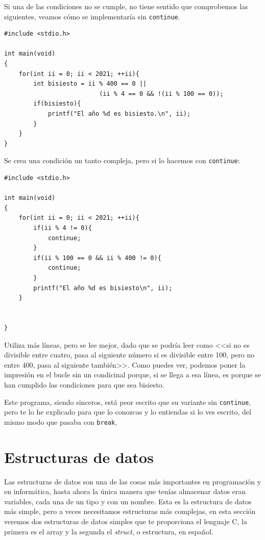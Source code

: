 \documentclass[a4paper]{article}
\begin{document}
Si una de las condiciones no se cumple, no tiene sentido que comprobemos
las siguientes, veamos cómo se implementaría sin \verb!continue!.

\noindent
\begin{minipage}[H]{\linewidth}
\mbox{}
\begin{lstlisting}[style=C,
caption={Ejemplo de algoritmo de año bisiesto},
label={lst:lapExample}]
#include <stdio.h>

int main(void)
{
    for(int ii = 0; ii < 2021; ++ii){
        int bisiesto = ii % 400 == 0 ||
                          (ii % 4 == 0 && !(ii % 100 == 0));
        if(bisiesto){
            printf("El año %d es bisiesto.\n", ii);
        }
    }
}
\end{lstlisting}
\end{minipage}

Se crea una condición un tanto compleja, pero si lo hacemos con \verb!continue!:

\noindent
\begin{minipage}[H]{\linewidth}
\mbox{}
\begin{lstlisting}[style=C,
caption={Ejemplo de algoritmo con continue},
label={lst:continueExample}]
#include <stdio.h>

int main(void)
{
    for(int ii = 0; ii < 2021; ++ii){
        if(ii % 4 != 0){
            continue;
        }
        if(ii % 100 == 0 && ii % 400 != 0){
            continue;
        }
        printf("El año %d es bisiesto\n", ii);
    }


}
\end{lstlisting}
\end{minipage}

Utiliza más líneas, pero se lee mejor, dado que se podría leer como <<si no
es divisible entre cuatro, pasa al siguiente número si es divisible entre 100,
pero no entre 400, pasa al siguiente también>>.
Como puedes ver, podemos poner la impresión en el bucle sin un condicinal
porque, si se llega a esa línea, es porque se han cumplido las condiciones para
que sea bisiesto.

Este programa, siendo sinceros, está peor escrito que su variante sin
\texttt{continue}, pero te lo he explicado para que  lo conozcas y lo entiendas
si lo ves escrito, del mismo modo que pasaba con \texttt{break},

\section{Estructuras de datos}
Las estructuras de datos son una de las cosas más importantes en programación
y en informática, hasta ahora la única manera que tenías almacenar datos eran
variables, cada una de un tipo y con un nombre. Esta es la estructura de datos
más simple, pero a veces necesitamos estructuras más complejas, en esta sección
veremos dos estructuras de datos simples que te proporciona el lenguaje C, la
primera es el array y la segunda el \textit{struct}, o estructura, en español.
\end{document}

